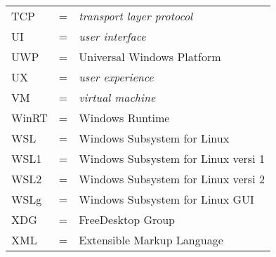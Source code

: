 \begin{tabular}{llp{3in}}
    TCP & \hspace{1.5cm} = & \textit{transport layer protocol}\\
    UI & \hspace{1.5cm} = & \textit{user interface}\\
    UWP & \hspace{1.5cm} = & Universal Windows Platform\\
    UX & \hspace{1.5cm} = & \textit{user experience}\\
    VM & \hspace{1.5cm} = & \textit{virtual machine}\\
    WinRT & \hspace{1.5cm} = & Windows Runtime\\
    WSL & \hspace{1.5cm} = & Windows Subsystem for Linux\\
    WSL1 & \hspace{1.5cm} = & Windows Subsystem for Linux versi 1\\
    WSL2 & \hspace{1.5cm} = & Windows Subsystem for Linux versi 2\\
    WSLg & \hspace{1.5cm} = & Windows Subsystem for Linux GUI\\
    XDG & \hspace{1.5cm} = & FreeDesktop Group\\
    XML & \hspace{1.5cm} = & Extensible Markup Language
\end{tabular}
